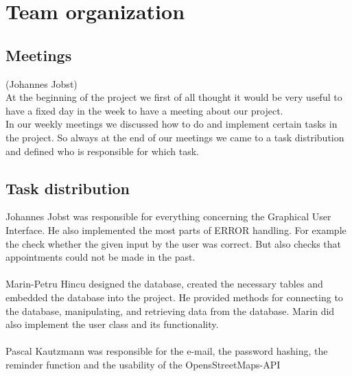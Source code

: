 \documentclass[a4paper, 12pt]{report}
\begin{document}
\chapter{Team organization}
\section{Meetings}
{\tiny (Johannes Jobst)\\}
At the beginning of the project we first of all thought it would be very useful 
to have a fixed day in the week to have a meeting about our project. \\
In our weekly meetings we discussed how to do and implement certain tasks in the project.
So always at the end of our meetings we came to a task distribution and defined who is
responsible for which task. 
\section{Task distribution}
Johannes Jobst was responsible for everything concerning the Graphical User Interface.
He also implemented the most parts of ERROR handling. For example the check whether the given
input by the user was correct. But also checks that appointments could not be made in the past. \\ \\
Marin-Petru Hincu designed the database, created the necessary tables and embedded the database into the project. He provided methods for connecting to the database, manipulating, and retrieving data from the database. Marin did also implement the user class and its functionality. \\ \\
Pascal Kautzmann was responsible for the e-mail, the password hashing, the reminder function and the usability of the OpensStreetMaps-API
\end{document}
